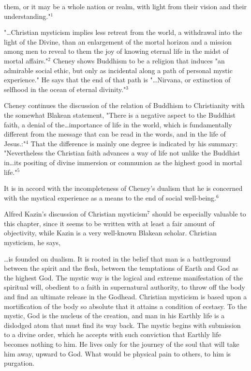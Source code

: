 \noindent them, or it may be
a whole nation or realm, with light from their vision and
their understanding."$^{1}$\par
\vspace*{0.5\baselineskip}
"\dots Christian mysticism implies less retreat from the
world, a withdrawal into the light of the Divine, than an
enlargement of the mortal horizon and a mission among men to
reveal to them the joy of knowing eternal life in the midst
of mortal affairs."$^{2}$ Cheney shows Buddhism to be a religion
that induces "an admirable social ethic, but only as incidental
along a path of personal mystic experience." He says that
the end of that path is "\dots Nirvana, or extinction of selfhood
in the ocean of eternal divinity."$^{3}$\par
\vspace*{0.5\baselineskip}
Cheney continues the discussion of the relation of Buddhism
to Christianity with the somewhat Blakean statement,
"There is a negative aspect to the Buddhist faith, a denial
of the\dots importance of life in the world, which is fundamentally
different from the message that can be read in the words, and
in the life of Jesus.:"$^{4}$ That the difference is mainly one
degree is indicated by his summary: "Nevertheless the
Christian faith advances a way of life not unlike the Buddhist
in\dots its positing of divine immersion or communion as
the highest good in mortal life."$^{5}$\par
\vspace*{0.5\baselineskip}
It is in accord with the incompleteness of Cheney's
dualism that he is concerned with the mystical experience
as a means to the end of social well-being.$^{6}$\par
\vspace*{0.5\baselineskip}
Alfred Kazin's discussion of Christian mysticism$^{7}$ should
be especially valuable to this chapter, since it seems to be
written with at least a fair amount of objectivity, while
Kazin is a very well-known Blakean scholar. Christian mysticism, he says,\par
\begin{center}
	\parbox{0.8\textwidth}{
		\hspace*{5mm}\dots is founded on dualism. It is rooted in the belief
		that man is a battleground between the spirit and the flesh,
		between the temptations of Earth and God as the highest God.
		The mystic way is the logical and extreme manifestation of
		the spiritual will, obedient to a faith in supernatural
		authority, to throw off the body and find an ultimate release in
		the Godhead. Christian mysticism is based upon a
		mortification of the body so absolute that it attains a condition
		of ecstasy. To the mystic, God is the nucleus of the
		creation, and man in his Earthly life is a dislodged atom
		that must find its way back. The mystic begins with submission
		to a divine order, which he accepts with such conviction
		that Earthly life becomes nothing to him. He lives
		only for the journey of the soul that will take him away,
		upward to God. What would be physical pain to others, to
		him is purgation.\par
	}%
\end{center}
